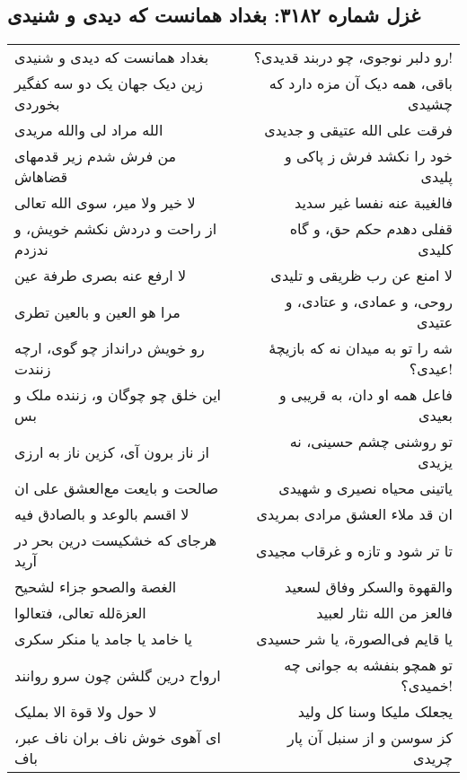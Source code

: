 \begin{center}
\section*{غزل شماره ۳۱۸۲: بغداد همانست که دیدی و شنیدی}
\label{sec:3182}
\begin{longtable}{l p{0.5cm} r}
بغداد همانست که دیدی و شنیدی
&&
رو دلبر نوجوی، چو دربند قدیدی؟!
\\
زین دیک جهان یک دو سه کفگیر بخوردی
&&
باقی، همه دیک آن مزه دارد که چشیدی
\\
الله مراد لی والله مریدی
&&
فرقت علی الله عتیقی و جدیدی
\\
من فرش شدم زیر قدمهای قضاهاش
&&
خود را نکشد فرش ز پاکی و پلیدی
\\
لا خیر ولا میر، سوی الله تعالی
&&
فالغیبة عنه نفسا غیر سدید
\\
از راحت و دردش نکشم خویش، و ندزدم
&&
قفلی دهدم حکم حق، و گاه کلیدی
\\
لا ارفع عنه بصری طرفة عین
&&
لا امنع عن رب ظریقی و تلیدی
\\
مرا هو العین و بالعین تطری
&&
روحی، و عمادی، و عتادی، و عتیدی
\\
رو خویش درانداز چو گوی، ارچه زنندت
&&
شه را تو به میدان نه که بازیچهٔ عیدی؟!
\\
این خلق چو چوگان و، زننده ملک و بس
&&
فاعل همه او دان، به قریبی و بعیدی
\\
از ناز برون آی، کزین ناز به ارزی
&&
تو روشنی چشم حسینی، نه یزیدی
\\
صالحت و بایعت مع‌العشق علی ان
&&
یاتینی محیاه نصیری و شهیدی
\\
لا اقسم بالوعد و بالصادق فیه
&&
ان قد ملاء العشق مرادی بمریدی
\\
هرجای که خشکیست درین بحر در آرید
&&
تا تر شود و تازه و غرقاب مجیدی
\\
الغصة والصحو جزاء لشحیح
&&
والقهوة والسکر وفاق لسعید
\\
العزةلله تعالی، فتعالوا
&&
فالعز من الله نثار لعبید
\\
یا خامد یا جامد یا منکر سکری
&&
یا قایم فی‌الصورة، یا شر حسیدی
\\
ارواح درین گلشن چون سرو روانند
&&
تو همچو بنفشه به جوانی چه خمیدی؟!
\\
لا حول ولا قوة الا بملیک
&&
یجعلک ملیکا وسنا کل ولید
\\
ای آهوی خوش ناف بران ناف عبر، باف
&&
کز سوسن و از سنبل آن پار چریدی
\\
\end{longtable}
\end{center}
